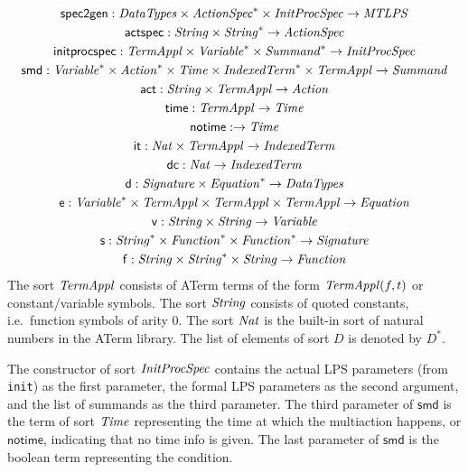 \documentclass[fleqn,a4paper,dvips]{article}
\newcommand{\aterm}[1]{\mathsf{#1}}
\newcommand{\afunc}[3]{\aterm{#1}:#2\rightarrow#3}
\begin{document}
\begin{gather*}
\afunc{spec2gen}{\nm{DataTypes}\x\nm{ActionSpec}^*\x\nm{InitProcSpec}}{\nm{MTLPS}}\\
\afunc{actspec}{\nm{String}\x\nm{String}^*}{\nm{ActionSpec}}\\
\afunc{initprocspec}{\nm{TermAppl}\x\nm{Variable}^*\x\nm{Summand}^*}{\nm{InitProcSpec}}\\
\afunc{smd}{\nm{Variable}^*\x\nm{Action}^*\x\nm{Time}\x\nm{IndexedTerm}^*\x\nm{TermAppl}}{\nm{Summand}}\\
\afunc{act}{\nm{String}\x\nm{TermAppl}}{\nm{Action}}\\
\afunc{time}{\nm{TermAppl}}{\nm{Time}}\\
\afunc{notime}{}{\nm{Time}}\\
\afunc{it}{\Nat\x\nm{TermAppl}}{\nm{IndexedTerm}}\\
\afunc{dc}{\Nat}{\nm{IndexedTerm}}\\
\afunc{d}{\nm{Signature}\x\nm{Equation}^*}{\nm{DataTypes}}\\
\afunc{e}{\nm{Variable}^*\x\nm{TermAppl}\x\nm{TermAppl}\x\nm{TermAppl}}{\nm{Equation}}\\
\afunc{v}{\nm{String}\x\nm{String}}{\nm{Variable}}\\
\afunc{s}{\nm{String}^*\x\nm{Function}^*\x\nm{Function}^*}{\nm{Signature}}\\
\afunc{f}{\nm{String}\x\nm{String}^{*}\x\nm{String}}{\nm{Function}}
\end{gather*}
The sort $\mathit{TermAppl}$ consists of ATerm terms of the form
$\mathit{TermAppl}(f,t)$ or constant/variable symbols. The sort
$\mathit{String}$ consists of quoted constants, i.e.\ function symbols of
arity 0. The sort $\mathit{Nat}$ is the built-in sort of natural numbers in
the ATerm library. The list of elements of sort $D$ is denoted by
$D^{*}$.

The constructor of sort $\mathit{InitProcSpec}$ contains the actual LPS
parameters (from \texttt{init}) as the first parameter, the formal LPS
parameters as the second argument, and the list of summands as the
third parameter. The third parameter of $\mathsf{smd}$ is the term of
sort $\mathit{Time}$ representing the time at which the multiaction
happens, or $\mathsf{notime}$, indicating that no time info is given.
The last parameter of $\mathsf{smd}$ is the boolean term representing
the condition.
\end{document}
